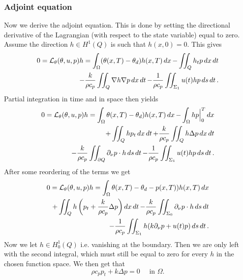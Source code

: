 \subsubsection{Adjoint equation}
Now we derive the adjoint equation. This is done by  setting the directional derivative of the Lagrangian (with respect to the state variable) equal to zero. Assume the direction $h\in H^1(Q)$ is such that $h(x, 0) = 0$. %
This gives
\begin{equation}
  \begin{aligned}
  0 = \mathcal{L}_\theta(\theta, u, p)h = \int_\Omega (\theta(x,T) - \theta_d)h(x, T)\mathop{dx} - \iint_Q h_t p\mathop{dx}\mathop{dt} \\
  - \frac{k}{\rho c_p}\iint_Q\nabla h\nabla p \mathop{dx}\mathop{dt}
  - \frac{1}{\rho c_p}\iint_{\Sigma_1} u(t)h p\mathop{ds}\mathop{dt}.
  \end{aligned}
\end{equation}
Partial integration in time and in space then yields
\begin{equation} %
  \begin{aligned}
  0 = \L_\theta(\theta, u, p)h = \int_\Omega \theta(x,T) - \theta_d)h(x, T)\dx - \int_\Omega hp\Big|_0^T \dx \\
  + \iint_Q h p_t\dxdt
  + \frac{k}{\rho c_p}\iint_Q h\Delta p \dxdt \\
  - \frac{k}{\rho c_p} \iint_{\partial Q}\partial_\nu p\cdot h\dsdt
  - \frac{1}{\rho c_p}\iint_{\Sigma_1} u(t)h p\dsdt.
  \end{aligned}
\end{equation}
After some reordering of the terms we get
\begin{equation}
  \begin{aligned}
  0 = \mathcal{L}_\theta(\theta, u, p)h = \int_\Omega \theta(x,T) - \theta_d-p(x, T))h(x, T)\mathop{dx} \\
  + \iint_Q h \left( p_t + \frac{k}{\rho c_p}\Delta p\right) \mathop{dx}\mathop{dt}
   - \frac{k}{\rho c_p} \iint_{\Sigma_0}\partial_\nu p\cdot h\mathop{ds}\mathop{dt} \\
   - \frac{1}{\rho c_p} \iint_{\Sigma_1}h(  k\partial_\nu p + u(t)p )\mathop{ds}\mathop{dt}.
  \end{aligned}
\end{equation}
Now we let $h\in H_0^1(Q)$ i.e. vanishing at the boundary. Then we are only left with the second integral, which must still be equal to zero for every $h$ in the chosen function space. We then get that
\begin{equation*}
  \rho c_p p_t + k\Delta p = 0 \quad\textrm{ in } \Omega.
\end{equation*}
